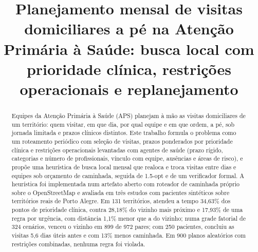 \documentclass[conference,a4paper]{IEEEtran}
\begin{document}
\title{Planejamento mensal de visitas domiciliares a pé na Atenção Primária à Saúde: busca local com prioridade clínica, restrições operacionais e replanejamento}

\author{
}

\maketitle

\begin{abstract}
Equipes da Atenção Primária à Saúde (APS) planejam à mão as visitas domiciliares de um território: quem visitar, em que dia, por qual equipe e em que ordem, a pé, sob jornada limitada e prazos clínicos distintos. Este trabalho formula o problema como um roteamento periódico com seleção de visitas, prazos ponderados por prioridade clínica e restrições operacionais levantadas com agentes de saúde (prazo rígido, categorias e número de profissionais, vínculo com equipe, ausências e áreas de risco), e propõe uma heurística de busca local mensal que realoca e troca visitas entre dias e equipes sob orçamento de caminhada, seguida de 1.5-opt e de um verificador formal. A heurística foi implementada num artefato aberto com roteador de caminhada próprio sobre o OpenStreetMap e avaliada em três estudos com pacientes sintéticos sobre territórios reais de Porto Alegre. Em 131 territórios, atendeu a tempo 34,63\% dos pontos de prioridade clínica, contra 28,18\% do vizinho mais próximo e 17,93\% de uma regra por urgência, com distância 1,1\% menor que a do vizinho; numa grade fatorial de 324 cenários, venceu o vizinho em 899 de 972 pares; com 250 pacientes, concluiu as visitas 5,6 dias úteis antes e com 13\% menos caminhada. Em 900 planos aleatórios com restrições combinadas, nenhuma regra foi violada.
\end{abstract}
\end{document}
